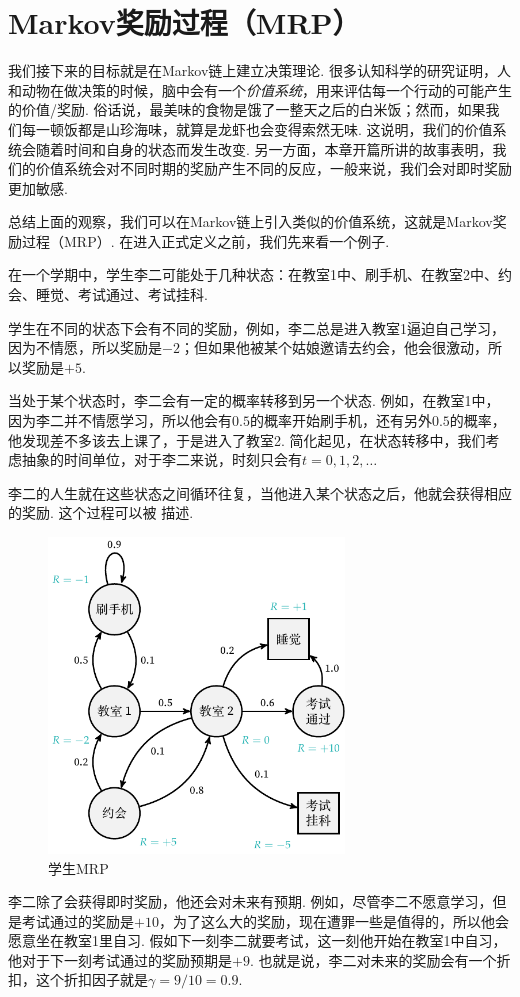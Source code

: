 \section{Markov奖励过程（MRP）}

我们接下来的目标就是在Markov链上建立决策理论. 很多认知科学的研究证明，人和动物在做决策的时候，脑中会有一个\emph{价值系统}，用来评估每一个行动的可能产生的价值/奖励. 俗话说，最美味的食物是饿了一整天之后的白米饭；然而，如果我们每一顿饭都是山珍海味，就算是龙虾也会变得索然无味. 这说明，我们的价值系统会随着时间和自身的状态而发生改变. 另一方面，本章开篇所讲的故事表明，我们的价值系统会对不同时期的奖励产生不同的反应，一般来说，我们会对即时奖励更加敏感.

总结上面的观察，我们可以在Markov链上引入类似的价值系统，这就是Markov奖励过程（MRP）. 在进入正式定义之前，我们先来看一个例子.

\begin{example}[李二的MRP]\label{ex:lier-MRP}
在一个学期中，学生李二可能处于几种状态：在教室1中、刷手机、在教室2中、约会、睡觉、考试通过、考试挂科. 

学生在不同的状态下会有不同的奖励，例如，李二总是进入教室1逼迫自己学习，因为不情愿，所以奖励是$-2$；但如果他被某个姑娘邀请去约会，他会很激动，所以奖励是$+5$. 

当处于某个状态时，李二会有一定的概率转移到另一个状态. 例如，在教室1中，因为李二并不情愿学习，所以他会有$0.5$的概率开始刷手机，还有另外$0.5$的概率，他发现差不多该去上课了，于是进入了教室2. 简化起见，在状态转移中，我们考虑抽象的时间单位，对于李二来说，时刻只会有$t=0,1,2,\dots$

李二的人生就在这些状态之间循环往复，当他进入某个状态之后，他就会获得相应的奖励. 这个过程可以被 描述.
\begin{figure}[ht]
    \centering
    \includegraphics[width=0.7\textwidth]{figures/Markov-chain/STR.pdf}
    \caption{学生MRP}
    \label{fig:student-MRP}
\end{figure}

李二除了会获得即时奖励，他还会对未来有预期. 例如，尽管李二不愿意学习，但是考试通过的奖励是$+10$，为了这么大的奖励，现在遭罪一些是值得的，所以他会愿意坐在教室1里自习. 假如下一刻李二就要考试，这一刻他开始在教室1中自习，他对于下一刻考试通过的奖励预期是$+9$. 也就是说，李二对未来的奖励会有一个折扣，这个折扣因子就是$\gamma=9/10=0.9$.
\end{example}

